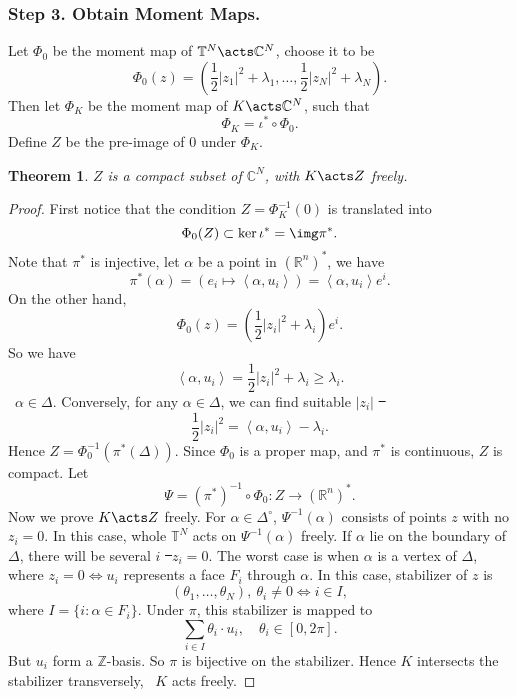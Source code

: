 \documentclass[12pt]{article}
\theoremstyle{plain}\newtheorem{theorem}{Theorem}
\theoremstyle{definition}\newtheorem{definition}[theorem]{Definition}
\theoremstyle{definition}\newtheorem{example}[theorem]{Example}
\theoremstyle{plain}\newtheorem{axiom}[theorem]{Axiom}
\theoremstyle{plain}\newtheorem{assertion}[theorem]{Assertion}
\theoremstyle{plain}\newtheorem{corollary}[theorem]{Corollary}
\theoremstyle{plain}\newtheorem{lemma}[theorem]{Lemma}
\theoremstyle{plain}\newtheorem{proposition}[theorem]{Proposition}
\theoremstyle{plain}\newtheorem{prop}[theorem]{Proposition}
\theoremstyle{plain}\newtheorem{conjecture}[theorem]{Conjecture}
\theoremstyle{plain}\newtheorem{conj}[theorem]{Conjecture}
\theoremstyle{plain}\newtheorem{problem}[theorem]{Problem}
\theoremstyle{remark}\newtheorem{notation}[theorem]{Notation}
\theoremstyle{definition}\newtheorem*{question}{Question}
\theoremstyle{definition}\newtheorem*{answer}{Answer}
\theoremstyle{definition}\newtheorem*{goal}{Goal}
\theoremstyle{plain}\newtheorem*{application}{Application}
\theoremstyle{plain}\newtheorem*{exercise}{Exercise}
\theoremstyle{remark}\newtheorem*{remark}{Remark}
\theoremstyle{remark}\newtheorem*{note}{\small{Note}}
\numberwithin{equation}{section}
\numberwithin{theorem}{section}
\numberwithin{figure}{section}
\begin{document}
\subsubsection*{Step 3. Obtain Moment Maps.}
Let \(\Phi_0\) be the moment map of \(\mathbb{T}^N\acts\mathbb{C}^N\), choose it
to be \[
    \Phi_0(z)=(\frac{1}{2}|z_1|^2+\lambda_1,\ldots,\frac{1}{2}|z_N|^2+\lambda_N)
.\] Then let \(\Phi_K\) be the moment map of \(K\acts \mathbb{C}^N\), such that \[
    \Phi_K=\iota^*\circ \Phi_0
.\] Define \(Z\) be the pre-image of 0 under \(\Phi_K\).
\begin{theorem}\label{thm:free-K-action}
    \(Z\) is a compact subset of \(\mathbb{C}^N\), with \(K\acts Z\) freely.
\end{theorem}
\begin{proof}
    First notice that the condition \(Z=\Phi_K^{-1}(0)\) is translated into \[
        \Phi_0(Z)\subset \ker\iota^*=\img \pi^*
    .\] Note that \(\pi^*\) is injective, let \(\alpha\) be a point in
    \((\mathbb{R}^n)^*\), we have \[
        \pi^*(\alpha)=(e_i\longmapsto \left<\alpha,u_i\right>)=\left<\alpha,u_i\right> 
        e^{i}
    .\] On the other hand, \[
        \Phi_0(z)=(\frac{1}{2}|z_i|^2+\lambda_i)e^{i}
    .\] So we have \[
        \left<\alpha,u_i\right> =\frac{1}{2}|z_i|^2+\lambda_i\ge \lambda_i
    .\] \ie\ \(\alpha\in \Delta\). Conversely, for any \(\alpha\in \Delta\),
    we can find suitable \(|z_i|\) \st\ \[
        \frac{1}{2}|z_i|^2=\left<\alpha,u_i\right>-\lambda_i
    .\] Hence \(Z=\Phi_0^{-1}(\pi^*(\Delta))\). Since \(\Phi_0\) is a proper map,
    and \(\pi^*\) is continuous, \(Z\) is compact. Let \[
        \Psi=(\pi^*)^{-1}\circ \Phi_0\colon Z\longrightarrow (\mathbb{R}^n)^*
    .\] Now we prove \(K\acts Z\) freely. For \(\alpha\in \Delta^\circ \),
    \(\Psi^{-1}(\alpha)\) consists of points \(z\) with no \(z_i=0\). In this case,
    whole \(\mathbb{T}^N\) acts on \(\Psi^{-1}(\alpha)\) freely. If \(\alpha\) lie
    on the boundary of \(\Delta\), there will be several \(i\) \st\ \(z_i=0\).
    The worst case is when \(\alpha\) is a vertex of \(\Delta\), where \(z_i=0\iff 
    u_i\) represents a face \(F_i\) through \(\alpha\). In this case, stabilizer of
    \(z\) is \[
        (\theta_1,\ldots,\theta_N),\ \theta_i \neq 0 \iff i\in I
    ,\] where \(I=\{i:\alpha\in F_i\}\). Under \(\pi\), this stabilizer is mapped to \[
        \sum_{i\in I}\theta_i\cdot u_i,\quad\theta_i\in [0,2\pi]
    .\] But \(u_i\) form a \(\mathbb{Z}\)-basis. So \(\pi\) is bijective on the
    stabilizer. Hence \(K\) intersects the stabilizer transversely, \ie\ \(K\) acts
    freely.
\end{proof}
\end{document}
